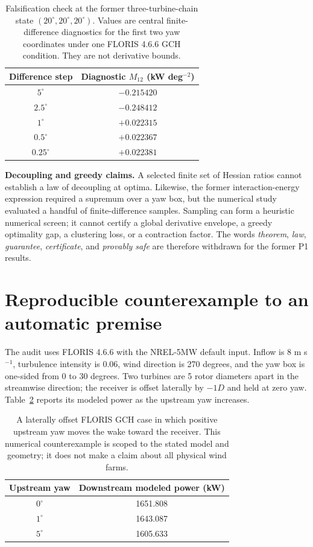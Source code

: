 \documentclass[wes, manuscript]{copernicus}
\begin{document}
\begin{table}[htbp]
\caption{Falsification check at the former three-turbine-chain state $(20^\circ,20^\circ,20^\circ)$. Values are central finite-difference diagnostics for the first two yaw coordinates under one FLORIS 4.6.6 GCH condition. They are not derivative bounds.}
\begin{tabular}{cc}
\hline
Difference step & Diagnostic $M_{12}$ (kW deg$^{-2}$) \\
\hline
$5^\circ$ & $-0.215420$ \\
$2.5^\circ$ & $-0.248412$ \\
$1^\circ$ & $+0.022315$ \\
$0.5^\circ$ & $+0.022367$ \\
$0.25^\circ$ & $+0.022381$ \\
\hline
\end{tabular}
\label{tab:fd}
\end{table}

\textbf{Decoupling and greedy claims.} A selected finite set of Hessian ratios cannot establish a law of decoupling at optima. Likewise, the former interaction-energy expression required a supremum over a yaw box, but the numerical study evaluated a handful of finite-difference samples. Sampling can form a heuristic numerical screen; it cannot certify a global derivative envelope, a greedy optimality gap, a clustering loss, or a contraction factor. The words \emph{theorem}, \emph{law}, \emph{guarantee}, \emph{certificate}, and \emph{provably safe} are therefore withdrawn for the former P1 results.

\section{Reproducible counterexample to an automatic premise}
\label{sec:counterexample}

The audit uses FLORIS 4.6.6 with the NREL-5MW default input. Inflow is 8 m s$^{-1}$, turbulence intensity is 0.06, wind direction is 270 degrees, and the yaw box is one-sided from 0 to 30 degrees. Two turbines are 5 rotor diameters apart in the streamwise direction; the receiver is offset laterally by $-1D$ and held at zero yaw. Table~\ref{tab:recovery} reports its modeled power as the upstream yaw increases.

\begin{table}[htbp]
\caption{A laterally offset FLORIS GCH case in which positive upstream yaw moves the wake toward the receiver. This numerical counterexample is scoped to the stated model and geometry; it does not make a claim about all physical wind farms.}
\begin{tabular}{cc}
\hline
Upstream yaw & Downstream modeled power (kW) \\
\hline
$0^\circ$ & 1651.808 \\
$1^\circ$ & 1643.087 \\
$5^\circ$ & 1605.633 \\
\hline
\end{tabular}
\label{tab:recovery}
\end{table}
\end{document}

